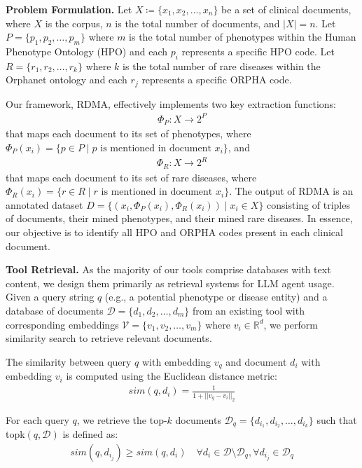 \label{appendix: exp method}

\textbf{Problem Formulation.} Let $X \coloneqq \{x_1, x_2, \ldots, x_n\}$ be a set of clinical documents, where $X$ is the corpus, $n$ is the total number of documents, and $|X| = n$. Let $P = \{p_1, p_2, \ldots, p_m\}$ where $m$ is the total number of phenotypes within the Human Phenotype Ontology (HPO) \cite{gargano2024mode_hpo} and each $p_i$ represents a specific HPO code. Let $R = \{r_1, r_2, \ldots, r_k\}$ where $k$ is the total number of rare diseases within the Orphanet ontology \cite{weinreich2008orphanet} and each $r_j$ represents a specific ORPHA code. 

Our framework, RDMA, effectively implements two key extraction functions: 
\begin{align}
\Phi_P: X \rightarrow 2^P
\end{align}
that maps each document to its set of phenotypes, where $\Phi_P(x_i) = \{p \in P \mid p \text{ is mentioned in document } x_i\}$, and 
\begin{align}
\Phi_R: X \rightarrow 2^R
\end{align}
that maps each document to its set of rare diseases, where $\Phi_R(x_i) = \{r \in R \mid r \text{ is mentioned in document } x_i\}$. The output of RDMA is an annotated dataset $D = \{(x_i, \Phi_P(x_i), \Phi_R(x_i)) \mid x_i \in X\}$ consisting of triples of documents, their mined phenotypes, and their mined rare diseases. In essence, our objective is to identify all HPO and ORPHA codes present in each clinical document.

\textbf{Tool Retrieval.} As the majority of our tools comprise databases with text content, we design them primarily as retrieval systems for LLM agent usage. 
Given a query string $q$ (e.g., a potential phenotype or disease entity) and a database of documents $\mathcal{D} = \{d_1, d_2, \ldots, d_m\}$ from an existing tool with corresponding embeddings $\mathcal{V} = \{v_1, v_2, \ldots, v_m\}$ where $v_i \in \mathbb{R}^d$, we perform similarity search to retrieve relevant documents.

The similarity between query $q$ with embedding $v_q$ and document $d_i$ with embedding $v_i$ is computed using the Euclidean distance metric:
\begin{align}
sim(q, d_i) = \frac{1}{1 + ||v_q - v_i||_2}
\end{align}

For each query $q$, we retrieve the top-$k$ documents $\mathcal{D}_q = \{d_{i_1}, d_{i_2}, \ldots, d_{i_k}\}$ such that topk$(q,\mathcal{D})$ is defined as:
\begin{align}
sim(q, d_{i_j}) \geq sim(q, d_i) \quad \forall d_i \in \mathcal{D} \setminus \mathcal{D}_q, \forall d_{i_j} \in \mathcal{D}_q
\end{align}

